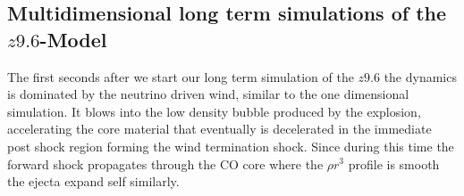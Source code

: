 \documentclass[fleqn,usenatbib]{mnras}
\begin{document}
\subsection{Multidimensional long term simulations of the $z9.6$-Model}
\label{subsec:muldidimensional longterm z9}
The first seconds after we start our long term simulation of the $z9.6$ the dynamics is dominated by the neutrino driven wind, similar to the one dimensional simulation. It blows into the low density bubble produced by the explosion, accelerating the core material that eventually is decelerated in the immediate post shock region forming the wind termination shock. 
Since during this time the forward shock propagates through the CO core where the $\rho r^3$ profile is smooth the ejecta expand self similarly. 
\end{document}
